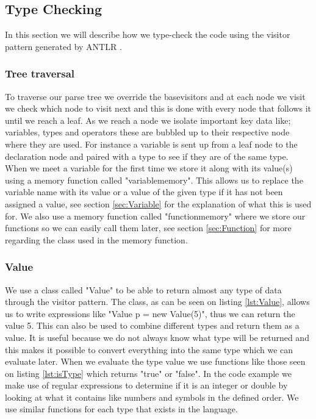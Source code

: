 \subsection{Type Checking}
\label{sec:typecheck}
In this section we will describe how we type-check the code using the visitor pattern generated by ANTLR \citep{ANTLR}.
\subsubsection{Tree traversal}
To traverse our parse tree we override the basevisitors and at each node we visit we check which node to visit next and this is done with every node that follows it until we reach a leaf. As we reach a node we isolate important key data like; variables, types and operators these are bubbled up to their respective node where they are used. For instance a variable is sent up from a leaf node to the declaration node and paired with a type to see if they are of the same type.
When we meet a variable for the first time we store it along with its value(s) using a memory function called "variablememory". This allows us to replace the variable name with its value or a value of the given type if it has not been assigned a value, see section \ref{sec:Variable} for the explanation of what this is used for. We also use a memory function called "functionmemory" where we store our functions so we can easily call them later, see section \ref{sec:Function} for more regarding the class used in the memory function.
\subsubsection{Value}
We use a class called "Value" to be able to return almost any type of data through the visitor pattern.
The class, as can be seen on listing \ref{lst:Value}, allows us to write expressions like "Value p = new Value(5)", thus we can return the value 5. This can also be used to combine different types and return them as a value. It is useful because we do not always know what type will be returned and this makes it possible to convert everything into the same type which we can evaluate later.
When we evaluate the type value we use functions like those seen on listing \ref{lst:isType} which returns "true" or "false". In the code example we make use of regular expressions to determine if it is an integer or double by looking at what it contains like numbers and symbols in the defined order. We use similar functions for each type that exists in the language.

